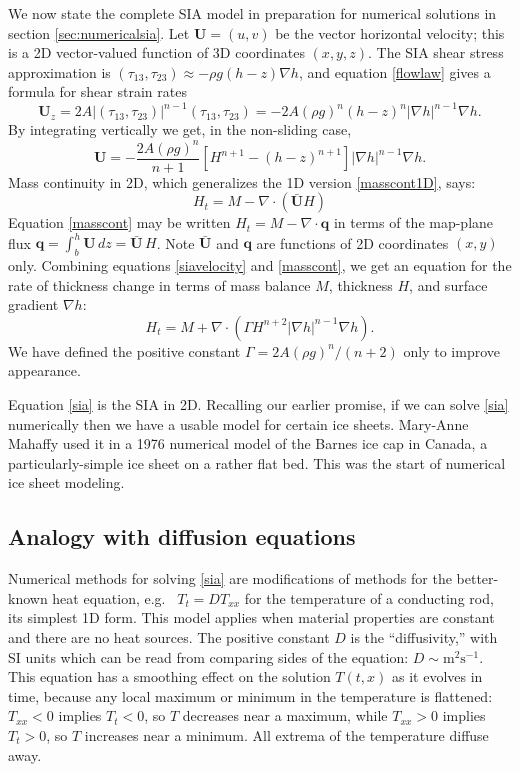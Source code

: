 \documentclass[letterpaper,final,12pt,reqno]{amsart}
\newcommand{\bq}{\mathbf{q}}
\newcommand{\grad}{\nabla}
\newcommand{\Div}{\nabla\cdot}
\begin{document}
We now state the complete SIA model in preparation for numerical solutions in section \ref{sec:numericalsia}.  Let $\mathbf{U} = (u,v)$ be the vector horizontal velocity; this is a 2D vector-valued function of 3D coordinates $(x,y,z)$.  The SIA shear stress approximation is $(\tau_{13},\tau_{23}) \approx - \rho g (h-z) \nabla h$, and equation \eqref{flowlaw} gives a formula for shear strain rates
\begin{equation*}
\mathbf{U}_z = 2 A |(\tau_{13},\tau_{23})|^{n-1} (\tau_{13},\tau_{23}) = - 2 A (\rho g)^n (h-z)^n |\nabla h|^{n-1} \nabla h.
\end{equation*}
By integrating vertically we get, in the non-sliding case,
\begin{equation}
\mathbf{U} = - \frac{2 A (\rho g)^n}{n+1} \left[H^{n+1} - (h-z)^{n+1}\right] |\nabla h|^{n-1} \nabla h.  \label{siavelocity}
\end{equation}
Mass continuity in 2D, which generalizes the 1D version \eqref{masscont1D}, says:
\begin{equation}
    H_t = M - \Div\left(\bar{\mathbf{U}} H\right)  \label{masscont}
\end{equation}
Equation \eqref{masscont} may be written $H_t = M - \Div \bq$ in terms of the map-plane flux $\bq = \int_{b}^{h} \mathbf{U}\,dz = \bar{\mathbf{U}}\,H$.  Note $\bar{\mathbf{U}}$ and $\bq$ are functions of 2D coordinates $(x,y)$ only.  Combining equations \eqref{siavelocity} and \eqref{masscont}, we get an equation for the rate of thickness change in terms of mass balance $M$, thickness $H$, and surface gradient $\grad h$:
\begin{equation}
H_t = M + \Div \left(\Gamma H^{n+2} |\grad h|^{n-1} \grad h \right). \label{sia}
\end{equation}
We have defined the positive constant $\Gamma = 2 A (\rho g)^n / (n+2)$ only to improve appearance.

Equation \eqref{sia} is the SIA in 2D.  Recalling our earlier promise, if we can solve \eqref{sia} numerically then we have a usable model for certain ice sheets.  Mary-Anne Mahaffy \cite{Mahaffy} used it in a 1976 numerical model of the Barnes ice cap in Canada, a particularly-simple ice sheet on a rather flat bed.  This was the start of numerical ice sheet modeling.

\subsection*{Analogy with diffusion equations}  Numerical methods for solving \eqref{sia} are modifications of methods for the better-known heat equation, e.g.~ $T_t = D T_{xx}$ for the temperature of a conducting rod, its simplest 1D form.  This model applies when material properties are constant and there are no heat sources.  The positive constant $D$ is the ``diffusivity,'' with SI units which can be read from comparing sides of the equation: $D\sim \text{m}^2 \text{s}^{-1}$.  This equation has a smoothing effect on the solution $T(t,x)$ as it evolves in time, because any local maximum or minimum in the temperature is flattened: $T_{xx}<0$ implies $T_t<0$, so $T$ decreases near a maximum, while $T_{xx}>0$ implies $T_t>0$, so $T$ increases near a minimum.  All extrema of the temperature diffuse away.
\end{document}
